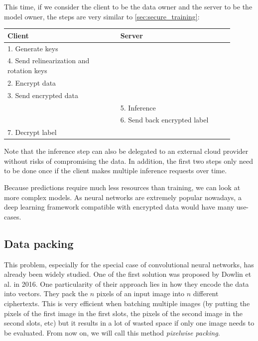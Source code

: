 \documentclass[a4paper,11pt,oneside]{report}
\begin{document}
This time, if we consider the client to be the data owner and the server to be the model owner, the steps are very similar to \autoref{sec:secure_training}:

\begin{table}[h!]
  \begin{center}
    \begin{tabular}{ p{0.45\linewidth} | p{0.45\linewidth} }
    \hline
    Client & Server \\
    \hline
    1. Generate keys &  \\
    4. Send relinearization and rotation keys &  \\
    2. Encrypt data &  \\
    3. Send encrypted data & \\
     & 5. Inference \\
     & 6. Send back encrypted label \\
    7. Decrypt label &  \\
    \hline
    \end{tabular}
  \end{center}
\end{table}

Note that the inference step can also be delegated to an external cloud provider without risks of compromising the data.
In addition, the first two steps only need to be done once if the client makes multiple inference requests over time.

Because predictions require much less resources than training, we can look at more complex models. 
As neural networks are extremely popular nowadays, a deep learning framework compatible with encrypted data would have many use-cases.

\subsection{Data packing}

This problem, especially for the special case of convolutional neural networks, has already been widely studied. One of the first solution was proposed by Dowlin et al. \cite{dowlin_cryptonets_2016} in 2016. 
One particularity of their approach lies in how they encode the data into vectors.
They pack the $n$ pixels of an input image into $n$ different ciphertexts. 
This is very efficient when batching multiple images (by putting the pixels of the first image in the first slots, the pixels of the second image in the second slots, etc) but it results in a lot of wasted space if only one image needs to be evaluated. 
From now on, we will call this method \emph{pixelwise packing}.
\end{document}
